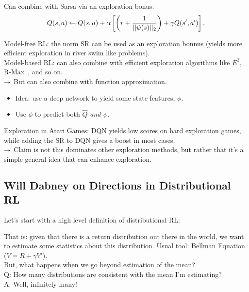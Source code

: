 Can combine with Sarsa via an exploration bonus:
\[
Q(s,a) \leftarrow Q(s,a) + \alpha \left[\left(r + \frac{1}{||\psi(s)||_2}\right) + \gamma Q(s',a')\right].
\]

Model-free RL: the norm SR can be used as an exploration bonnus (yields more efficient exploration in river swim like problems). \\

Model-based RL: can also combine with efficient exploration algorithms like $E^3$, R-Max~\cite{brafman2002r}, and so on.\\

$\rightarrow$ But can also combine with function approximation. 
\begin{itemize}
    \item Idea: use a deep network to yield some state features, $\phi$.
    \item Use $\phi$ to predict both $\hat{Q}$ {\it and} $\psi$.
\end{itemize}

Exploration in Atari Games:  DQN yields low scores on hard exploration games, while adding the SR to DQN gives a boost in most cases. \\

$\rightarrow$ Claim is not this dominates other exploration methods, but rather that it's a simple general idea that can enhance exploration. \\

\spacerule


\subsection{Will Dabney on Directions in Distributional RL}

Let's start with a high level definition of distributional RL:

That is: given that there is a return distribution out there in the world, we want to estimate some statistics about this distribution. Usual tool: Bellman Equation ($V = R + \gamma V'$). \\

But, what happens when we go beyond estimation of the mean? \\

Q: How many distributions are consistent with the mean I'm estimating? \\

A: Well, infinitely many! \\

